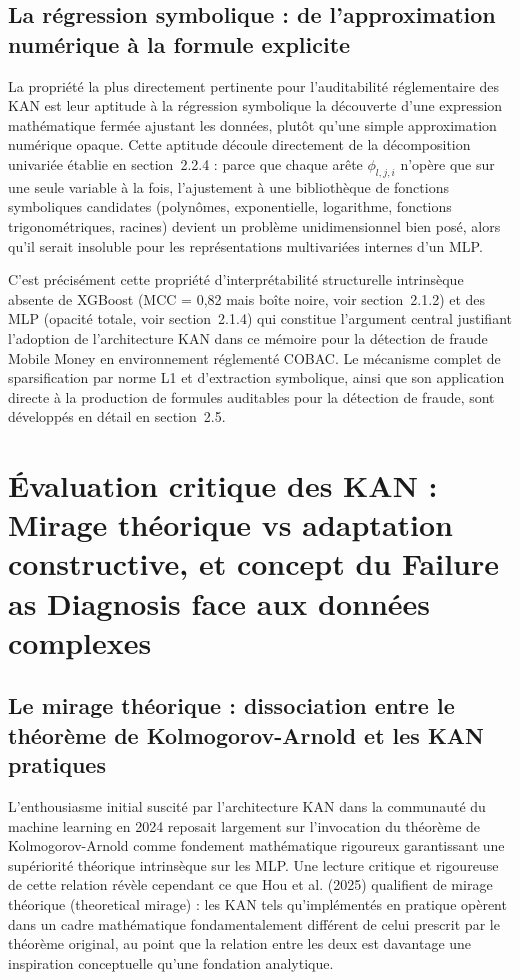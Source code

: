 \documentclass[11pt,a4paper,oneside]{report}
\theoremstyle{definition}
\theoremstyle{remark}
\begin{document}
\subsection{La régression symbolique : de l'approximation numérique à la formule explicite}

La propriété la plus directement pertinente pour l'auditabilité réglementaire des KAN est leur aptitude à la régression symbolique  la découverte d'une expression mathématique fermée ajustant les données, plutôt qu'une simple approximation numérique opaque. Cette aptitude découle directement de la décomposition univariée établie en section~2.2.4 : parce que chaque arête $\phi_{l,j,i}$ n'opère que sur une seule variable à la fois, l'ajustement à une bibliothèque de fonctions symboliques candidates (polynômes, exponentielle, logarithme, fonctions trigonométriques, racines) devient un problème unidimensionnel bien posé, alors qu'il serait insoluble pour les représentations multivariées internes d'un MLP.

C'est précisément cette propriété d'interprétabilité structurelle intrinsèque  absente de XGBoost (MCC = 0,82 mais boîte noire, voir section~2.1.2) et des MLP (opacité totale, voir section~2.1.4)  qui constitue l'argument central justifiant l'adoption de l'architecture KAN dans ce mémoire pour la détection de fraude Mobile Money en environnement réglementé COBAC. Le mécanisme complet de sparsification par norme L1 et d'extraction symbolique, ainsi que son application directe à la production de formules auditables pour la détection de fraude, sont développés en détail en section~2.5.

\section{Évaluation critique des KAN : \og Mirage théorique \fg{} vs adaptation constructive, et concept du \og Failure as Diagnosis \fg{} face aux données complexes}

\subsection{Le mirage théorique : dissociation entre le théorème de Kolmogorov-Arnold et les KAN pratiques}

L'enthousiasme initial suscité par l'architecture KAN dans la communauté du machine learning en 2024 reposait largement sur l'invocation du théorème de Kolmogorov-Arnold comme fondement mathématique rigoureux garantissant une supériorité théorique intrinsèque sur les MLP. Une lecture critique et rigoureuse de cette relation révèle cependant ce que Hou et al. (2025) qualifient de mirage théorique (theoretical mirage) : les KAN tels qu'implémentés en pratique opèrent dans un cadre mathématique fondamentalement différent de celui prescrit par le théorème original, au point que la relation entre les deux est davantage une inspiration conceptuelle qu'une fondation analytique.
\end{document}
